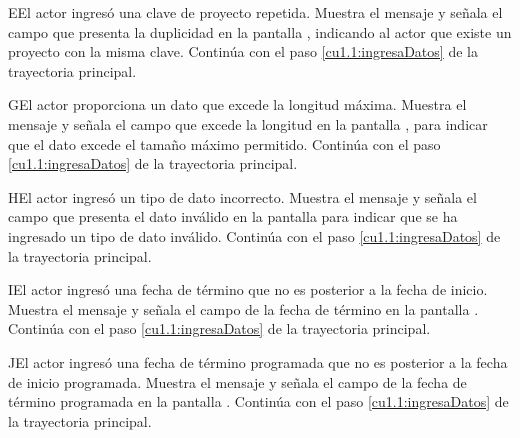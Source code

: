  \begin{UCtrayectoriaA}{E}{El actor ingresó una clave de proyecto repetida.}
    \UCpaso[\UCsist] Muestra el mensaje  y señala el campo que presenta la duplicidad en la pantalla 
	    , indicando al actor que existe un proyecto con la misma clave.
    \UCpaso[] Continúa con el paso \ref{cu1.1:ingresaDatos} de la trayectoria principal.
 \end{UCtrayectoriaA}
 
 \begin{UCtrayectoriaA}{G}{El actor proporciona un dato que excede la longitud máxima.}
    \UCpaso[\UCsist] Muestra el mensaje  y señala el campo que excede la 
    longitud en la pantalla , para indicar que el dato excede el tamaño máximo permitido.
    \UCpaso[] Continúa con el paso \ref{cu1.1:ingresaDatos} de la trayectoria principal.
 \end{UCtrayectoriaA}
 
 \begin{UCtrayectoriaA}{H}{El actor ingresó un tipo de dato incorrecto.}
    \UCpaso[\UCsist] Muestra el mensaje  y señala el campo que presenta el dato inválido en la 
    pantalla  para indicar que se ha ingresado un tipo de dato inválido.
    \UCpaso[] Continúa con el paso \ref{cu1.1:ingresaDatos} de la trayectoria principal.
 \end{UCtrayectoriaA}
 \begin{UCtrayectoriaA}{I}{El actor ingresó una fecha de término que no es posterior a la fecha de inicio.}
    \UCpaso[\UCsist] Muestra el mensaje  y señala el campo de la fecha de término en la 
    pantalla .
    \UCpaso[] Continúa con el paso \ref{cu1.1:ingresaDatos} de la trayectoria principal.
 \end{UCtrayectoriaA}
 \begin{UCtrayectoriaA}{J}{El actor ingresó una fecha de término programada que no es posterior a la fecha de inicio programada.}
    \UCpaso[\UCsist] Muestra el mensaje  y señala el campo de la fecha de término programada en la 
    pantalla .
    \UCpaso[] Continúa con el paso \ref{cu1.1:ingresaDatos} de la trayectoria principal.
 \end{UCtrayectoriaA}
 